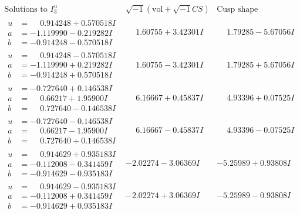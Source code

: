 \documentclass[1p]{elsarticle_modified}
\theoremstyle{definition}
\newcommand{\I}{\sqrt{-1}}
\begin{document}
$$\begin{array}{c|c|c}  
\text{Solutions to }I^u_{3}& \I (\text{vol} + \sqrt{-1}CS) & \text{Cusp shape}\\
 \hline 
\begin{aligned}
u &= \phantom{-}0.914248 + 0.570518 I \\
a &= -1.119990 - 0.219282 I \\
b &= -0.914248 - 0.570518 I\end{aligned}
 & \phantom{-}1.60755 + 3.42301 I & \phantom{-}1.79285 - 5.67056 I \\ \hline\begin{aligned}
u &= \phantom{-}0.914248 - 0.570518 I \\
a &= -1.119990 + 0.219282 I \\
b &= -0.914248 + 0.570518 I\end{aligned}
 & \phantom{-}1.60755 - 3.42301 I & \phantom{-}1.79285 + 5.67056 I \\ \hline\begin{aligned}
u &= -0.727640 + 0.146538 I \\
a &= \phantom{-}0.66217 + 1.95900 I \\
b &= \phantom{-}0.727640 - 0.146538 I\end{aligned}
 & \phantom{-}6.16667 + 0.45837 I & \phantom{-}4.93396 + 0.07525 I \\ \hline\begin{aligned}
u &= -0.727640 - 0.146538 I \\
a &= \phantom{-}0.66217 - 1.95900 I \\
b &= \phantom{-}0.727640 + 0.146538 I\end{aligned}
 & \phantom{-}6.16667 - 0.45837 I & \phantom{-}4.93396 - 0.07525 I \\ \hline\begin{aligned}
u &= \phantom{-}0.914629 + 0.935183 I \\
a &= -0.112008 - 0.341459 I \\
b &= -0.914629 - 0.935183 I\end{aligned}
 & -2.02274 - 3.06369 I & -5.25989 + 0.93808 I \\ \hline\begin{aligned}
u &= \phantom{-}0.914629 - 0.935183 I \\
a &= -0.112008 + 0.341459 I \\
b &= -0.914629 + 0.935183 I\end{aligned}
 & -2.02274 + 3.06369 I & -5.25989 - 0.93808 I \\ \hline\begin{aligned}

\end{aligned}
\end{array}$$
\end{document}
